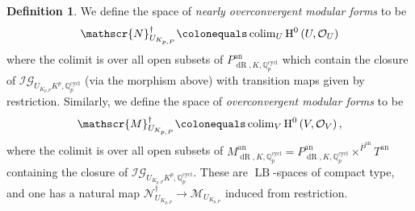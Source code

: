 \documentclass[10pt, oneside]{amsart}
\newcommand{\defeq}{\colonequals}
\numberwithin{equation}{subsection}
\theoremstyle{definition}
\newtheorem{definition}[equation]{Definition}
\theoremstyle{remark}
\newcommand{\mbb}[1]{\mathbb{#1}}
\newcommand{\opn}[1]{\operatorname{#1}}
\begin{document}
\begin{definition}
We define the space of \emph{nearly overconvergent modular forms} to be
\[
\mathscr{N}^{\dagger}_{U_{K_{p, P}}} \defeq \opn{colim}_U \opn{H}^0\left(U, \mathcal{O}_U \right)
\]
where the colimit is over all open subsets of $P_{\opn{dR}, K, \mbb{Q}_p^{\opn{cycl}}}^{\opn{an}}$ which contain the closure of $\mathcal{IG}_{U_{K_{p, P}}K^p, \mbb{Q}_p^{\opn{cycl}}}$ (via the morphism above) with transition maps given by restriction. Similarly, we define the space of \emph{overconvergent modular forms} to be \[ \mathscr{M}^{\dagger}_{U_{K_{p, P}}} \defeq \opn{colim}_V \opn{H}^0\left(V, \mathcal{O}_V\right), \] where the colimit is over all open subsets of $M_{\opn{dR}, K, \mbb{Q}_p^{\opn{cycl}}}^{\opn{an}} = P_{\opn{dR}, K, \mbb{Q}_p^{\opn{cycl}}}^{\opn{an}} \times^{\overline{P}^{\opn{an}}} T^{\opn{an}}$ containing the closure of $\mathcal{IG}_{U_{K_{p, P}}K^p, \mbb{Q}_p^{\opn{cycl}}}$. These are $\opn{LB}$-spaces of compact type, and one has a natural map $\mathscr{N}^{\dagger}_{U_{K_{p, P}}} \to \mathscr{M}_{U_{K_{p, P}}}$ induced from restriction.
\end{definition}
\end{document}
